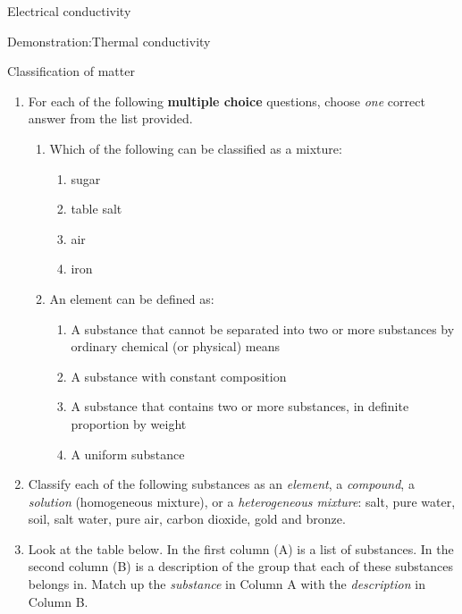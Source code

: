 \begin{iexperiment}{Electrical conductivity}
\begin{gexperiment}{Demonstration:Thermal conductivity}
\begin{eocexercises}{Classification of matter }
{\begin{enumerate}[noitemsep, label=\textbf{\arabic*}. ]
            \label{m38706*uid133}\item For each of the following \textbf{multiple choice} questions, choose \textsl{one} correct answer from the list provided.
\label{m38706*id67947}\begin{enumerate}[noitemsep, label=\textbf{\alph*}. ] 
            \label{m38706*uid134}\item Which of the following can be classified as a mixture:
\label{m38706*id67963}\begin{enumerate}[noitemsep, label=\textbf{\alph*}. ] 
            \label{m38706*uid135}\item sugar
\label{m38706*uid136}\item table salt
\label{m38706*uid137}\item air
\label{m38706*uid138}\item iron
\end{enumerate}
                \label{m38706*uid139}\item An element can be defined as:
\label{m38706*id68029}\begin{enumerate}[noitemsep, label=\textbf{\alph*}. ] 
            \label{m38706*uid140}\item A substance that cannot be separated into two or more substances by ordinary chemical (or physical) means
\label{m38706*uid141}\item A substance with constant composition
\label{m38706*uid142}\item A substance that contains two or more substances, in definite proportion by weight
\label{m38706*uid143}\item A uniform substance
\end{enumerate}
                \end{enumerate}
\label{m38706*uid144}\item Classify each of the following substances as an \textsl{element}, a \textsl{compound}, a \textsl{solution} (homogeneous mixture), or a \textsl{heterogeneous mixture}: salt, pure water, soil, salt water, pure air, carbon dioxide, gold and bronze.\newline
\label{m38706*uid145}\item Look at the table below. In the first column (A) is a list of substances. In the second column (B) is a description of the group that each of these substances belongs in. Match up the \textsl{substance} in Column A with the \textsl{description} in Column B.
          \begin{table}[H]

\end{table}
\end{enumerate}}
\end{eocexercises}
\end{gexperiment}
\end{iexperiment}
